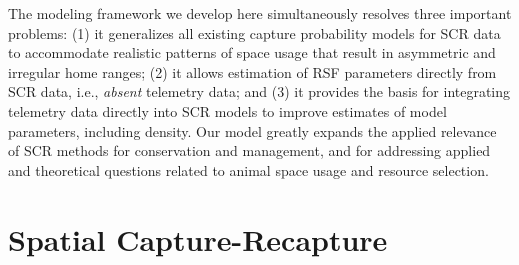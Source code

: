 \documentclass[12pt]{article}
\begin{document}

The modeling framework we develop here simultaneously resolves three
important %
problems: (1) it generalizes all existing capture probability models
for SCR data to accommodate realistic patterns of space usage that
result in asymmetric and irregular home
ranges; %
(2) it allows estimation of RSF parameters directly from SCR data,
i.e., {\it absent} telemetry data; and (3) it provides the basis for
integrating telemetry data directly into SCR models to improve
estimates of model parameters, including density.  Our model greatly
expands the applied relevance of SCR methods for conservation and
management, and for addressing applied and theoretical questions
related to animal space usage and resource selection.


\section{Spatial Capture-Recapture}
\end{document}
